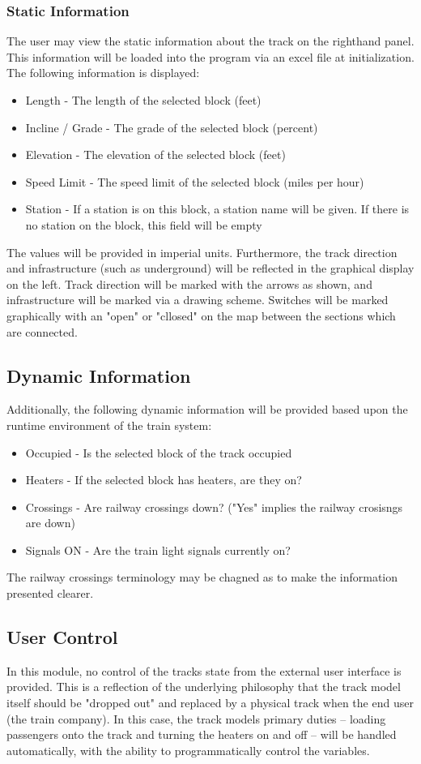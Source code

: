 \documentclass[letterpaper]{article}
\begin{document}
	\subsubsection{Static Information}
	The user may view the static information about the track on the righthand panel. This information will be loaded into the program via an excel file at initialization. The following information is displayed:
		\begin{itemize}
			\item Length - The length of the selected block (feet)
			\item Incline / Grade - The grade of the selected block (percent)
			\item Elevation - The elevation of the selected block (feet)
			\item Speed Limit - The speed limit of the selected block (miles per hour)
			\item Station - If a station is on this block, a station name will be given. If there is no station on the block, this field will be empty
		\end{itemize}
		The values will be provided in imperial units. Furthermore, the track direction and infrastructure (such as underground) will be reflected in the graphical display on the left. Track direction will be marked with the arrows as shown, and infrastructure will be marked via a drawing scheme. Switches will be marked graphically with an "open" or "cllosed" on the map between the sections which are connected.
	
\subsection{Dynamic Information}
		Additionally, the following dynamic information will be provided based upon the runtime environment of the train system:
		\begin{itemize}
			\item Occupied - Is the selected block of the track occupied
			\item Heaters - If the selected block has heaters, are they on?
			\item Crossings - Are railway crossings down? ("Yes" implies the railway crosisngs are down)
			\item Signals ON - Are the train light signals currently on?
		\end{itemize}
		The railway crossings terminology may be chagned as to make the information presented clearer.

\subsection{User Control}
In this module, no control of the tracks state from the external user interface is provided. This is a reflection of the underlying philosophy that the track model itself should be "dropped out" and replaced by a physical track when the end user (the train company). In this case, the track models primary duties -- loading passengers onto the track and turning the heaters on and off -- will be handled automatically, with the ability to programmatically control the variables. 
\end{document}
